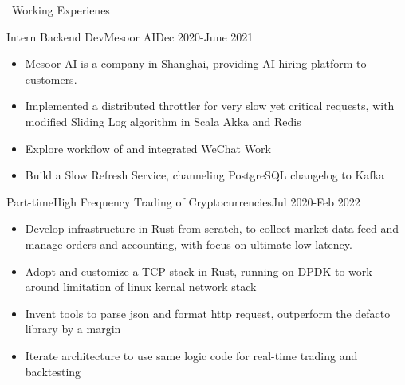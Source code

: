 \documentclass{resume}
\begin{document}
\begin{rSection}{\faUsers~Working Experienes}
    \begin{rExperience}{Intern Backend Dev}{Mesoor AI}{Dec 2020-June 2021}
        \begin{itemize}
            \itemsep -0.5em \vspace{-0.5em}
            \item Mesoor AI is a company in Shanghai, providing AI hiring platform to customers.
            \item Implemented a distributed throttler for very slow yet critical requests, with modified Sliding Log algorithm in Scala Akka and Redis
            \item Explore workflow of and integrated WeChat Work
            \item Build a Slow Refresh Service, channeling PostgreSQL changelog to Kafka       
        \end{itemize}
    \end{rExperience}
    \begin{rExperience}{Part-time}{High Frequency Trading of Cryptocurrencies}{Jul 2020-Feb 2022}
        \begin{itemize}
            \itemsep -0.5em \vspace{-0.5em}
            \item Develop infrastructure in Rust from scratch, to collect market data feed and manage orders and accounting, with focus on ultimate low latency.
            \item Adopt and customize a TCP stack in Rust, running on DPDK to work around limitation of linux kernal network stack
            \item Invent tools to parse json and format http request, outperform the defacto library by a margin
            \item Iterate architecture to use same logic code for real-time trading and backtesting
        \end{itemize}
    \end{rExperience}

\end{rSection}
\end{document}
